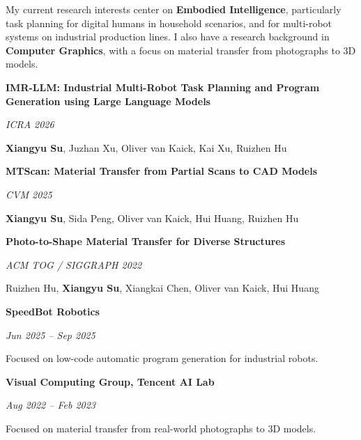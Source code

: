 \documentclass[10pt,a4paper,UTF8]{altacv}
\newcommand{\pub}[3]{%
  \begin{minipage}[t]{0.72\linewidth}\raggedright\textbf{#1}\end{minipage}\hfill\begin{minipage}[t]{0.27\linewidth}\raggedleft\textit{#3}\end{minipage}\par
  \vspace{5pt}
  {\color{authorgrey}#2}\par\vspace{10pt}
}
\newcommand{\role}[3]{%
  \begin{minipage}[t]{0.72\linewidth}\raggedright\textbf{#1}\end{minipage}\hfill\begin{minipage}[t]{0.27\linewidth}\raggedleft\textit{#2}\end{minipage}\par
  \vspace{5pt}
  {#3}\par\vspace{10pt}
}
\begin{document}

\begin{fullwidth}
\makecvheader
\end{fullwidth}



{\justifying My current research interests center on \textbf{Embodied Intelligence}, particularly task planning for digital humans in household scenarios, and for multi-robot systems on industrial production lines. I also have a research background in \textbf{Computer Graphics}, with a focus on material transfer from photographs to 3D models.\par}

\vspace{12pt}


\pub
  {IMR-LLM: Industrial Multi-Robot Task Planning and Program Generation using Large Language Models}
  {\textbf{Xiangyu Su}, Juzhan Xu, Oliver van Kaick, Kai Xu, Ruizhen Hu}
  {ICRA 2026}

\pub
  {MTScan: Material Transfer from Partial Scans to CAD Models}
  {\textbf{Xiangyu Su}, Sida Peng, Oliver van Kaick, Hui Huang, Ruizhen Hu}
  {CVM 2025}

\pub
  {Photo-to-Shape Material Transfer for Diverse Structures}
  {Ruizhen Hu, \textbf{Xiangyu Su}, Xiangkai Chen, Oliver van Kaick, Hui Huang}
  {ACM TOG / SIGGRAPH 2022}



\role
  {SpeedBot Robotics}
  {Jun 2025 -- Sep 2025}
  {Focused on low-code automatic program generation for industrial robots.}

\role
  {Visual Computing Group, Tencent AI Lab}
  {Aug 2022 -- Feb 2023}
  {Focused on material transfer from real-world photographs to 3D models.}
\end{document}
